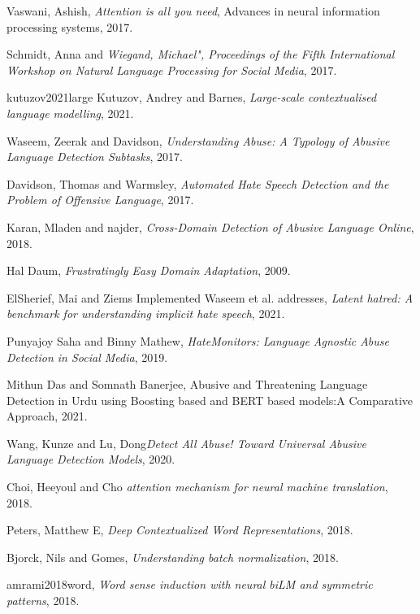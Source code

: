 \documentclass{article}
\begin{document}




Vaswani, Ashish, \emph{Attention is all you need}, Advances in neural information processing systems, 2017.

Schmidt, Anna  and \emph{Wiegand, Michael", Proceedings of the Fifth International Workshop on Natural Language Processing for Social Media}, 2017.

kutuzov2021large
Kutuzov, Andrey and Barnes, \emph{Large-scale contextualised language modelling}, 2021.

Waseem, Zeerak  and Davidson, \emph{Understanding Abuse: A Typology of Abusive Language Detection Subtasks}, 2017.

Davidson, Thomas and Warmsley, \emph{Automated Hate Speech Detection and the Problem of Offensive Language}, 2017.

Karan, Mladen  and najder, \emph{Cross-Domain Detection of Abusive Language Online}, 2018.

Hal Daum, \emph{Frustratingly Easy Domain Adaptation}, 2009.

ElSherief, Mai and Ziems Implemented Waseem et al. addresses, \emph{Latent hatred: A benchmark for understanding implicit hate speech}, 2021.

Punyajoy Saha and Binny Mathew, \emph{HateMonitors: Language Agnostic Abuse Detection in Social Media}, 2019.

Mithun Das and Somnath Banerjee, Abusive and Threatening Language Detection in Urdu using Boosting based and {BERT} based models:{A} Comparative Approach, 2021.

Wang, Kunze  and Lu, Dong\emph{Detect All Abuse! Toward Universal Abusive Language Detection Models}, 2020.

Choi, Heeyoul and Cho \emph{attention mechanism for neural machine translation}, 2018.

Peters, Matthew E, \emph{Deep Contextualized Word Representations}, 2018.

Bjorck, Nils and Gomes, \emph{Understanding batch normalization}, 2018.

amrami2018word, \emph{Word sense induction with neural biLM and symmetric patterns}, 2018.










\end{document}
